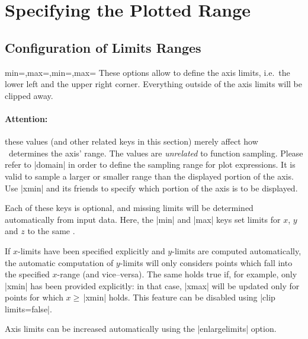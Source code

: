 

\section{Specifying the Plotted Range}

\subsection{Configuration of Limits Ranges}

\begin{pgfplotsxykeylist}{\x min=,\x max=,min=,max=}
These options allow to define the axis limits, i.e.\ the lower left and the upper right corner. Everything outside of the axis limits will be clipped away.

\paragraph{Attention:} these values (and other related keys in this section) merely affect how \PGFPlots\ determines the axis' range. The values are \emph{unrelated} to function sampling. Please refer to |domain| in order to define the sampling range for plot expressions. It is valid to sample a larger or smaller range than the displayed portion of the axis. Use |xmin| and its friends to specify which portion of the axis is to be displayed.

Each of these keys is optional, and missing limits will be determined automatically from input data. Here, the |min| and |max| keys set limits for $x$, $y$ and $z$ to the same .

If $x$-limits have been specified explicitly and $y$-limits are computed automatically, the automatic computation of $y$-limits will only considers points which fall into the specified $x$-range (and vice--versa). The same holds true if, for example, only |xmin| has been provided explicitly: in that case, |xmax| will be updated only for points for which $x \ge \,$|xmin| holds. This feature can be disabled using |clip limits=false|. 

Axis limits can be increased automatically using the |enlargelimits| option.
\begin{codeexample}[]
\end{codeexample}


\end{pgfplotsxykeylist}

